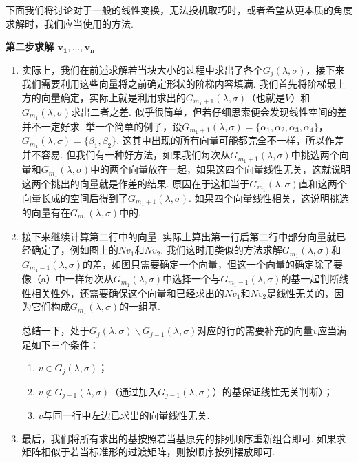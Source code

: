 \begin{solution}

\end{solution}

下面我们将讨论对于一般的线性变换，无法投机取巧时，或者希望从更本质的角度求解时，我们应当使用的方法.

\begin{center}
    \textbf{\heiti 第二步\quad 求解 $\boldsymbol{v_1,\ldots,v_n}$}
\end{center}

\begin{enumerate}
    \item 实际上，我们在前述求解若当块大小的过程中求出了各个$G_j(\lambda,\sigma)$，接下来我们需要利用这些向量将之前确定形状的阶梯内容填满. 我们首先将阶梯最上方的向量确定，实际上就是利用求出的$G_{m_1+1}(\lambda,\sigma)$（也就是$V$）和$G_{m_1}(\lambda,\sigma)$求出二者之差. 似乎很简单，但若仔细思索便会发现线性空间的差并不一定好求. 举一个简单的例子，设$G_{m_1+1}(\lambda,\sigma)=\{\alpha_1,\alpha_2,\alpha_3,\alpha_4\}$，$G_{m_1}(\lambda,\sigma)=\{\beta_1,\beta_2\}$. 这其中出现的所有向量可能都完全不一样，所以作差并不容易. 但我们有一种好方法，如果我们每次从$G_{m_1+1}(\lambda,\sigma)$中挑选两个向量和$G_{m_1}(\lambda,\sigma)$中的两个向量放在一起，如果这四个向量线性无关，这就说明这两个挑出的向量就是作差的结果. 原因在于这相当于$G_{m_1}(\lambda,\sigma)$直和这两个向量长成的空间后得到了$G_{m_1+1}(\lambda,\sigma)$. 如果四个向量线性相关，这说明挑选的向量有在$G_{m_1}(\lambda,\sigma)$中的.

    \item 接下来继续计算第二行中的向量. 实际上算出第一行后第二行中部分向量就已经确定了，例如图上的$Nv_1$和$Nv_2$. 我们这时用类似的方法求解$G_{m_1}(\lambda,\sigma)$和$G_{m_1-1}(\lambda,\sigma)$的差，如图只需要确定一个向量，但这一个向量的确定除了要像（a）中一样每次从$G_{m_1}(\lambda,\sigma)$中选择一个与$G_{m_1-1}(\lambda,\sigma)$的基一起判断线性相关性外，还需要确保这个向量和已经求出的$Nv_1$和$Nv_2$是线性无关的，因为它们构成$G_{m_1}(\lambda,\sigma)$的一组基.

          总结一下，处于$G_j(\lambda,\sigma)\backslash G_{j-1}(\lambda,\sigma)$对应的行的需要补充的向量$v$应当满足如下三个条件：
          \begin{enumerate}
              \item $v\in G_j(\lambda,\sigma)$；

              \item $v\notin G_{j-1}(\lambda,\sigma)$（通过加入$G_{j-1}(\lambda,\sigma)$）的基保证线性无关判断）；

              \item $v$与同一行中左边已求出的向量线性无关.
          \end{enumerate}

    \item 最后，我们将所有求出的基按照若当基原先的排列顺序重新组合即可. 如果求矩阵相似于若当标准形的过渡矩阵，则按顺序按列摆放即可.
\end{enumerate}

